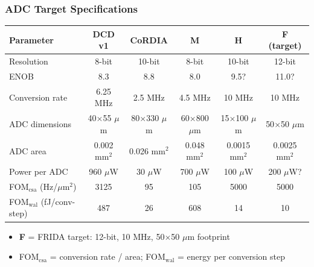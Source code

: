 \documentclass[aspectratio=169]{beamer}
\begin{document}
\begin{frame}
  \frametitle{ADC Target Specifications}
  \begin{center}
    \small
    \begin{tabular}{l|ccccc}
      \hline
      \textbf{Parameter} & \textbf{DCD v1} & \textbf{CoRDIA} & \textbf{M} & \textbf{H} & \textbf{F (target)} \\
      \hline
      Resolution          & 8-bit       & 10-bit     & 8-bit      & 10-bit      & 12-bit      \\
      ENOB                & 8.3         & 8.8        & 8.0        & 9.5?        & 11.0?       \\
      Conversion rate     & 6.25 MHz    & 2.5 MHz    & 4.5 MHz    & 10 MHz      & 10 MHz      \\
      ADC dimensions      & 40$\times$55 $\mu$m & 80$\times$330 $\mu$m & 60$\times$800 $\mu$m & 15$\times$100 $\mu$m & 50$\times$50 $\mu$m \\
      ADC area            & 0.002 mm$^2$ & 0.026 mm$^2$ & 0.048 mm$^2$ & 0.0015 mm$^2$ & 0.0025 mm$^2$ \\
      Power per ADC       & 960 $\mu$W  & 30 $\mu$W  & 700 $\mu$W & 100 $\mu$W  & 200 $\mu$W? \\
      FOM$_{\mathrm{csa}}$ (Hz/$\mu$m$^2$) & 3125 & 95 & 105 & 5000 & 5000 \\
      FOM$_{\mathrm{wal}}$ (fJ/conv-step) & 487 & 26 & 608 & 14 & 10 \\
      \hline
    \end{tabular}
  \end{center}
  \vspace{0.5em}
  \begin{itemize}
    \item \textbf{F} = FRIDA target: 12-bit, 10 MHz, 50$\times$50 $\mu$m footprint
    \item FOM$_{\mathrm{csa}}$ = conversion rate / area; FOM$_{\mathrm{wal}}$ = energy per conversion step
  \end{itemize}
\end{frame}
\end{document}
